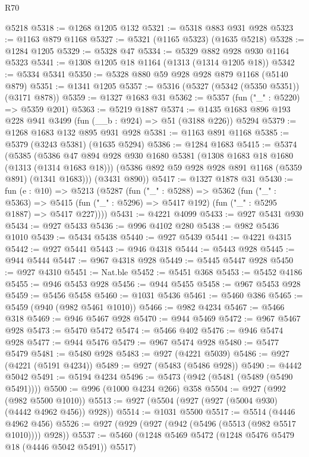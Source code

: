 \begin{lexlean}{R70}
\begin{coremodule}
    @5218
@5318 := @1268 @1205 @132
@5321 := @5318 @883 @931 @928
@5323 := @1163 @879 @1168
@5327 := @5321 (@1165 @5323) (@1635 @5218)
@5328 := @1284 @1205
@5329 := @5328 @47
@5334 := @5329 @882 @928 @930 @1164 @5323
@5341 := @1308 @1205 @18 @1164 (@1313 (@1314 @1205 @18))
@5342 := @5334 @5341
@5350 := @5328 @880 @59 @928 @928 @879 @1168 (@5140 @879)
@5351 := @1341 @1205
@5357 := @5316 (@5327 (@5342 (@5350 @5351)) (@3171 @878))
@5359 := @1327 @1683 @31
@5362 := @5357 (fun ("_" : @5220) => @5359 @201)
@5363 := @5219 @1887
@5374 := @1435 @1683 @896 @193 @228 @941 @3499 (fun (__b : @924) => @51 (@3188 @226)) @5294
@5379 := @1268 @1683 @132 @895 @931 @928
@5381 := @1163 @891 @1168
@5385 := @5379 (@3243 @5381) (@1635 @5294)
@5386 := @1284 @1683
@5415 := @5374
    (@5385
      (@5386
        @47
        @894
        @928
        @930
        @1680
        @5381
        (@1308 @1683 @18 @1680 (@1313 (@1314 @1683 @18)))
        (@5386 @892 @59 @928 @928 @891 @1168 (@5359 @891) (@1341 @1683)))
      (@3431 @890))
@5417 := @1327 @1878 @31
@5430 := fun (e : @10) =>
  @5213
    (@5287
      (fun ("_" : @5288) =>
      @5362
        (fun ("_" : @5363) =>
        @5415 (fun ("_" : @5296) => @5417 @192) (fun ("_" : @5295 @1887) => @5417 @227))))
@5431 := @4221 @4099
@5433 := @927 @5431 @930
@5434 := @927 @5433
@5436 := @996 @4102 @280
@5438 := @982 @5436 @1010
@5439 := @5434 @5438
@5440 := @927 @5439
@5441 := @4221 @4315
@5442 := @927 @5441
@5443 := @946 @4318
@5444 := @5443 @928
@5445 := @944 @5444
@5447 := @967 @4318 @928
@5449 := @5445 @5447 @928
@5450 := @927 @4310
@5451 := Nat.ble
@5452 := @5451 @368
@5453 := @5452 @4186
@5455 := @946 @5453 @928
@5456 := @944 @5455
@5458 := @967 @5453 @928
@5459 := @5456 @5458
@5460 := @1031 @5436
@5461 := @5460 @386
@5465 := @5459 (@940 (@982 @5461 @1010))
@5466 := @982 @4234
@5467 := @5466 @318
@5469 := @946 @5467 @928
@5470 := @944 @5469
@5472 := @967 @5467 @928
@5473 := @5470 @5472
@5474 := @5466 @402
@5476 := @946 @5474 @928
@5477 := @944 @5476
@5479 := @967 @5474 @928
@5480 := @5477 @5479
@5481 := @5480 @928
@5483 := @927 (@4221 @5039)
@5486 := @927 (@4221 (@5191 @4234))
@5489 := @927 (@5483 (@5486 @928))
@5490 := @4442 @5042
@5491 := @5194 @4234
@5496 := @5473 (@942 (@5481 (@5489 (@5490 @5491))))
@5500 := @996 (@1000 @4234 @266) @358
@5504 := @927 (@992 (@982 @5500 @1010))
@5513 := @927 (@5504 (@927 (@927 (@5004 @930) (@4442 @4962 @456)) @928))
@5514 := @1031 @5500
@5517 := @5514 (@4446 @4962 @456)
@5526 := @927 (@929 (@927 (@942 (@5496 (@5513 (@982 @5517 @1010)))) @928))
@5537 := @5460 (@1248 @5469 @5472 (@1248 @5476 @5479 @18 (@4446 @5042 @5491)) @5517)

\end{coremodule}
\end{lexlean}
